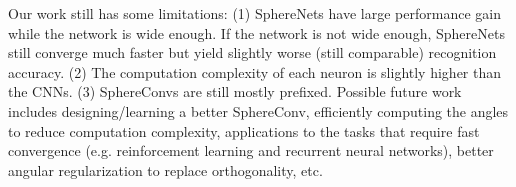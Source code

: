 Our work still has some limitations: (1) SphereNets have large performance gain while the network is wide enough. If the network is not wide enough, SphereNets still converge much faster but yield slightly worse (still comparable) recognition accuracy. (2) The computation complexity of each neuron is slightly higher than the CNNs. (3) SphereConvs are still mostly prefixed. Possible future work includes designing/learning a better SphereConv, efficiently computing the angles to reduce computation complexity, applications to the tasks that require fast convergence (e.g. reinforcement learning and recurrent neural networks), better angular  regularization to replace orthogonality, etc.



